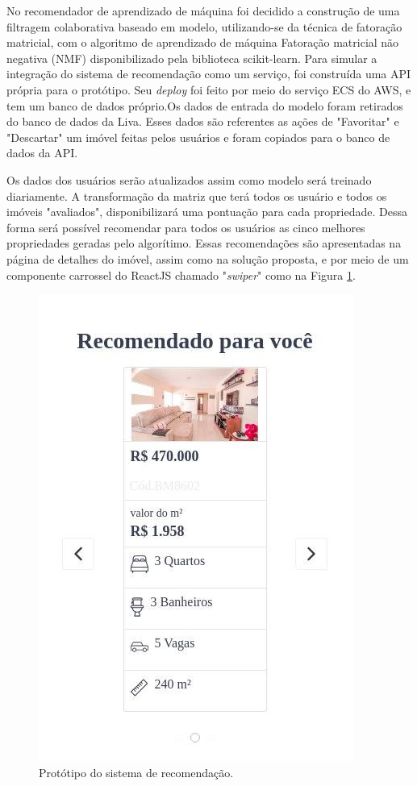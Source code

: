 No recomendador de aprendizado de máquina foi decidido a construção de uma filtragem colaborativa baseado em modelo, utilizando-se da técnica de fatoração matricial, com o algoritmo de aprendizado de máquina Fatoração matricial não negativa (NMF) disponibilizado pela biblioteca scikit-learn. Para simular a integração do sistema de recomendação como um serviço, foi construída uma API própria para o protótipo. Seu \textit{deploy} foi feito por meio do serviço ECS do AWS, e tem um banco de dados próprio.Os dados de entrada do modelo foram retirados do banco de dados da Liva. Esses dados são referentes as ações de "Favoritar" e "Descartar" um imóvel feitas pelos usuários e foram copiados para o banco de dados da API.

Os dados dos usuários serão atualizados assim como modelo será treinado diariamente. A transformação da matriz que terá todos os usuário e todos os imóveis "avaliados", disponibilizará uma pontuação para cada propriedade. Dessa forma será possível recomendar para todos os usuários as cinco melhores propriedades geradas pelo algorítimo. Essas recomendações são apresentadas na página de detalhes do imóvel, assim como na solução proposta, e por meio de um componente carrossel do ReactJS chamado "\textit{swiper}" como na Figura \ref{fig:prototipo_simulacao_rs}.

\begin{figure}[H]
    \centering
    \includegraphics[scale=0.6]{figuras/consideracoes_finais/prototipo_simulacao_rs.jpg}
    \caption[Protótipo do sistema de recomendação]{Protótipo do sistema de recomendação.}
    \label{fig:prototipo_simulacao_rs}
\end{figure}

